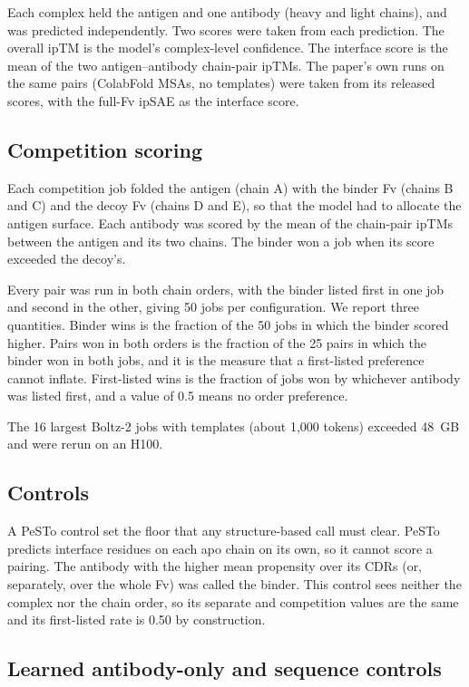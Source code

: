 \documentclass[11pt,a4paper]{article}
\begin{document}
Each complex held the antigen and one antibody (heavy and light chains), and was predicted independently.
Two scores were taken from each prediction.
The overall ipTM is the model's complex-level confidence.
The interface score is the mean of the two antigen--antibody chain-pair ipTMs.
The paper's own runs on the same pairs (ColabFold MSAs, no templates) were taken from its released scores, with the full-Fv ipSAE as the interface score.

\subsection{Competition scoring}

Each competition job folded the antigen (chain A) with the binder Fv (chains B and C) and the decoy Fv (chains D and E), so that the model had to allocate the antigen surface.
Each antibody was scored by the mean of the chain-pair ipTMs between the antigen and its two chains.
The binder won a job when its score exceeded the decoy's.

Every pair was run in both chain orders, with the binder listed first in one job and second in the other, giving 50 jobs per configuration.
We report three quantities.
Binder wins is the fraction of the 50 jobs in which the binder scored higher.
Pairs won in both orders is the fraction of the 25 pairs in which the binder won in both jobs, and it is the measure that a first-listed preference cannot inflate.
First-listed wins is the fraction of jobs won by whichever antibody was listed first, and a value of 0.5 means no order preference.

The 16 largest Boltz-2 jobs with templates (about 1,000 tokens) exceeded 48~GB and were rerun on an H100.

\subsection{Controls}

A PeSTo control \cite{pesto} set the floor that any structure-based call must clear.
PeSTo predicts interface residues on each apo chain on its own, so it cannot score a pairing.
The antibody with the higher mean propensity over its CDRs (or, separately, over the whole Fv) was called the binder.
This control sees neither the complex nor the chain order, so its separate and competition values are the same and its first-listed rate is 0.50 by construction.

\subsection{Learned antibody-only and sequence controls}
\label{sec:logreg-methods}
\end{document}
